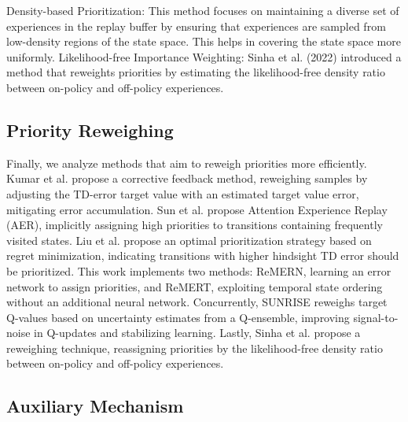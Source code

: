 

Density-based Prioritization: This method focuses on maintaining a diverse set of experiences in the replay buffer by ensuring that experiences are sampled from low-density regions of the state space. This helps in covering the state space more uniformly.
Likelihood-free Importance Weighting: Sinha et al. (2022) introduced a method that reweights priorities by estimating the likelihood-free density ratio between on-policy and off-policy experiences.


\subsection{Priority Reweighing}

Finally, we analyze methods that aim to reweigh priorities more efficiently. Kumar et al. \cite{kumar2020discor}  propose a corrective feedback method, reweighing samples by adjusting the TD-error target value with an estimated target value error, mitigating error accumulation. Sun et al. \cite{sun2020attentive} propose Attention Experience Replay (AER), implicitly assigning high priorities to transitions containing frequently visited states. Liu et al. \cite{liu2021regret} propose an optimal prioritization strategy based on regret minimization, indicating transitions with higher hindsight TD error should be prioritized. This work implements two methods: ReMERN, learning an error network to assign priorities, and ReMERT, exploiting temporal state ordering without an additional neural network. Concurrently, SUNRISE \cite{lee2021sunrise} reweighs target Q-values based on uncertainty estimates from a Q-ensemble, improving signal-to-noise in Q-updates and stabilizing learning. Lastly, Sinha et al. \cite{sinha2022experience}  propose a reweighing technique, reassigning priorities by the likelihood-free density ratio between on-policy and off-policy experiences.


\subsection{Auxiliary Mechanism}


